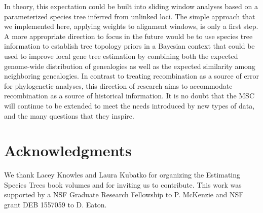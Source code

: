 \documentclass[11pt]{article}
\begin{document}
In theory, this expectation could be built into sliding window analyses based on a parameterized species tree inferred from unlinked loci. The simple approach that we implemented here, applying weights to alignment windows, is only a first step. A more appropriate direction to focus in the future would be to use species tree information to establish tree topology priors in a Bayesian context that could be used to improve local gene tree estimation by combining both the expected genome-wide distribution of genealogies as well as the expected similarity among neighboring genealogies. In contrast to treating recombination as a source of error for phylogenetic analyses, this direction of research aims to accommodate recombination as a source of historical information. It is no doubt that the MSC will continue to be extended to meet the needs introduced by new types of data, and the many questions that they inspire. 






\section*{Acknowledgments}
We thank Lacey Knowles and Laura Kubatko for organizing the Estimating Species Trees book volumes and for inviting us to contribute. This work was supported by a NSF Graduate Research Fellowship to P. McKenzie and NSF grant DEB 1557059 to D. Eaton.
\end{document}
